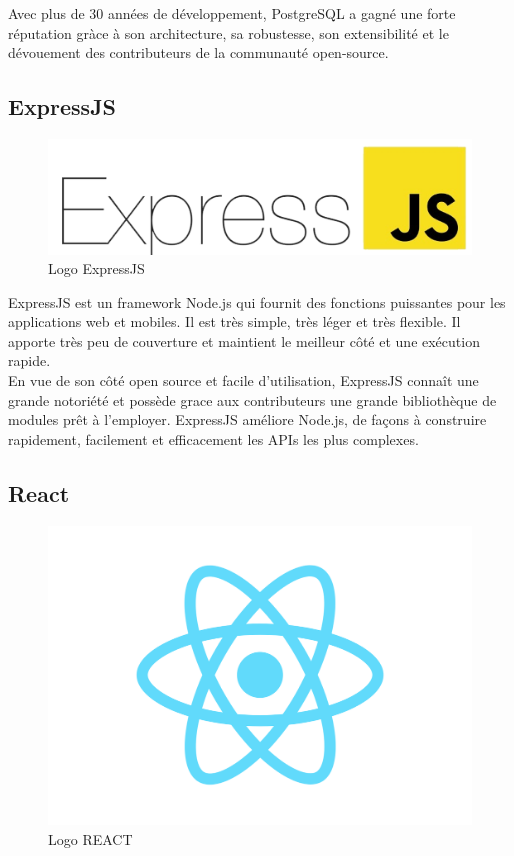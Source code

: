     Avec plus de 30 années de développement, PostgreSQL a gagné une forte réputation gràce à son architecture, sa robustesse, son extensibilité et le dévouement des contributeurs de la communauté open-source.\\

    \subsection{ExpressJS}
    \begin{figure}[H]
        \centering
        \includegraphics[scale=0.16]{ACR/ExpressJS-logo.png}
        \caption{Logo ExpressJS}
    \end{figure}
    
    ExpressJS\cite{expressjs} est un framework Node.js qui fournit des fonctions puissantes pour les applications web et mobiles. Il est très simple, très léger et très flexible. Il apporte très peu de couverture et maintient le meilleur côté et une exécution rapide.\\

    En vue de son côté open source et facile d'utilisation, ExpressJS connaît une grande notoriété et possède grace aux contributeurs une grande bibliothèque de modules prêt à l'employer. ExpressJS améliore Node.js, de façons à construire rapidement, facilement et efficacement les APIs les plus complexes.\\ 

    \subsection{React}
    \begin{figure}[H]
        \centering
        \includegraphics[scale=0.16]{ACR/react.png}
        \caption{Logo REACT}
    \end{figure}

